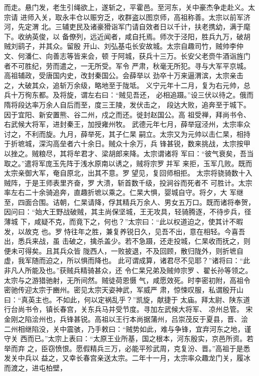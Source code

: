 \documentclass[12pt,UTF8]{ctexbook}
\begin{document}
而走。悬门发，老生引绳欲上，遂斩之，平霍邑。至河东，关中豪杰争走赴义。太宗请
进师入关，取永丰仓以赈穷乏，收群盗以图京师，高祖称善。太宗以前军济河，先定渭
北。三辅吏民及诸豪猾诣军门请自效者日以千计，扶老携幼，满于麾下。收纳英俊，以
备僚列，远近闻者，咸自托焉。师次于泾阳，胜兵九万，破胡贼刘鹞子，并其众。留殷
开山、刘弘基屯长安故城。太宗自趣司竹，贼帅李仲文、何潘仁、向善志等皆来会，顿
于阿城，获兵十三万。长安父老赍牛酒诣旌门者不可胜纪，劳而遣之，一无所受。军令
严肃，秋毫无所犯。寻与大军平京城。高祖辅政，受唐国内史，改封秦国公。会薛举以
劲卒十万来逼渭滨，太宗亲击之，大破其众，追斩万余级，略地至于陇坻。
义宁元年十二月，复为右元帅，总兵十万徇东都。及将旋，谓左右曰：“贼见吾还，
必相追蹑。”设三伏以待之。俄而隋将段达率万余人自后而至，度三王陵，发伏击之，
段达大败，追奔至于城下。因于宜阳、新安置熊、谷二州，戍之而还。徙封赵国公。高
祖受禅，拜尚书令、右武候大将军，进封秦王，加授雍州牧。
武德元年七月，薛举寇泾州，太宗率众讨之，不利而旋。九月，薛举死，其子仁杲
嗣立。太宗又为元帅以击仁杲，相持于折墌城，深沟高垒者六十余日。贼众十余万，兵
锋甚锐，数来挑战，太宗按甲以挫之。贼粮尽，其将牟君才、梁胡郎来降。太宗谓诸将
军曰：“彼气衰矣，吾当取之。”遣将军庞玉先阵于浅水原南以诱之，贼将宗罗并军
来拒，玉军几败。既而太宗亲御大军，奄自原北，出其不意。罗望见，复回师相拒。
太宗将骁骑数十入贼阵，于是王师表里齐奋，罗大溃，斩首数千级，投涧谷而死者不
可胜计。太宗率左右二十余骑追奔，直趣折墌以乘之。仁杲大惧，婴城自守。将夕，大
军继至，四面合围。诘朝，仁杲请降，俘其精兵万余人、男女五万口。既而诸将奉贺，
因问曰：“始大王野战破贼，其主尚保坚城，王无攻具，轻骑腾逐，不待步兵，径薄城
下，咸疑不克，而竟下之，何也？”太宗曰：“此以权道迫之，使其计不暇发，以故克
也。罗恃往年之胜，兼复养锐日久，见吾不出，意在相轻。今喜吾出，悉兵来战，虽
击破之，擒杀盖少。若不急蹑，还走投城，仁杲收而抚之，则便未可得矣。且其兵众皆
陇西人，一败披退，不及回顾，散归陇外，则折墌自虚，我军随而迫之，所以惧而降也。
此可谓成算，诸君尽不见耶？”诸将曰：“此非凡人所能及也。”获贼兵精骑甚众，还
令仁杲兄弟及贼帅宗罗、翟长孙等领之。太宗与之游猎驰射，无所间然。贼徒荷恩慑
气，咸愿效死。时李密初附，高祖令密驰传迎太宗于豳州。密见太宗天姿神武，军威严
肃，惊悚叹服，私谓殷开山曰：“真英主也。不如此，何以定祸乱乎？”凯旋，献捷于
太庙。拜太尉、陕东道行台尚书令，镇长春宫，关东兵马并受节度。寻加左武候大将军、
凉州总管。
宋金刚之陷浍州也，兵锋甚锐。高祖以王行本尚据蒲州，吕崇茂反于夏县，晋、浍
二州相继陷没，关中震骇，乃手敕曰：“贼势如此，难与争锋，宜弃河东之地，谨守关
西而已。”太宗上表曰：“太原王业所基，国之根本，河东殷实，京邑所资。若举而弃
之，臣窃愤恨。愿假精兵三万，必能平殄武周，克复汾、晋。”高祖于是悉发关中兵以
益之，又幸长春宫亲送太宗。二年十一月，太宗率众趣龙门关，履冰而渡之，进屯柏壁，
\end{document}
